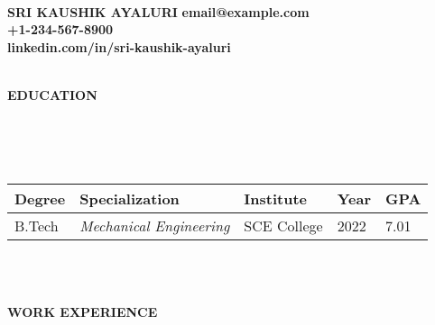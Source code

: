 \documentclass[a4paper,10pt]{article}
\newcommand{\lsep}{-0.5cm}
\newcommand{\resheading}[1]{%
  \par\noindent%
  \small%
  \colorbox{mygrey}{%
    \parbox{\dimexpr\linewidth-2\fboxsep\relax}{%
      \textbf{#1}%
    }%
  }%
  \par\nobreak%
}
\begin{document}
\hspace{0.5cm}\\[-1.8cm]

\textbf{SRI KAUSHIK AYALURI} \hspace{9.6cm} {\bf email@example.com}\\
 \hspace{10.3cm} {\bf +1-234-567-8900} \\
 \hspace{7.9cm} {\bf linkedin.com/in/sri-kaushik-ayaluri} \\
 \\


\vspace{-2mm}
\resheading{\textbf{EDUCATION} }\\[\lsep]\\ \\
\indent \begin{tabular}{ p{2.5cm} @{\hskip 0.15in} p{5.5cm} @{\hskip 0.15in} p{3.5cm} @{\hskip 0.15in} p{2.5cm} @{\hskip 0.15in} p{1.5cm} }
\toprule
\textbf{Degree} & \textbf{Specialization} & \textbf{Institute} & \textbf{Year} & \textbf{GPA} \\
\midrule
B.Tech & \textit{Mechanical Engineering} & SCE College & 2022 & 7.01 \\
\bottomrule
\end{tabular}
\\ \\

\vspace{1mm}

\resheading{\textbf{WORK EXPERIENCE} }
\end{document}
